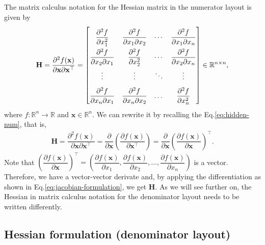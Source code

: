 \documentclass{article}
\begin{document}
The matrix calculus notation for the Hessian matrix in the numerator layout is given by
\begin{align}
    \label{eq:hessian-eq-numerator}
    \mathbf{H} = \dfrac{\partial^{2} f(\mathbf{x})}{\partial \mathbf{x} \partial \mathbf{x}^\top} = \renewcommand{\arraystretch}{2.2}\begin{bmatrix}
        \dfrac{\partial^{2} f}{\partial x_1^2} & \dfrac{\partial^{2} f}{\partial x_1 \partial x_2} & \cdots & \dfrac{\partial^{2} f}{\partial x_1 \partial x_n} \\
        \dfrac{\partial^{2} f}{\partial x_2 \partial x_1} & \dfrac{\partial^{2} f}{\partial x_2^2} & \cdots & \dfrac{\partial^{2} f}{\partial x_2 \partial x_n} \\
        \vdots & \vdots & \ddots & \vdots \\
        \dfrac{\partial^{2} f}{\partial x_n \partial x_1} & \dfrac{\partial^{2} f}{\partial x_n \partial x_2} & \dots & \dfrac{\partial^{2} f}{\partial x_n^2}
    \end{bmatrix} \in \mathbb{R}^{n \times n},
\end{align}
where \(f: \mathbb{R}^{n} \rightarrow \mathbb{R}\) and \(\mathbf{x} \in \mathbb{R}^{n}\). We can rewrite it by recalling the Eq.\eqref{eq:hidden-num}, that is,
\begin{align}
    \mathbf{H} = \dfrac{\partial^{2} f(\mathbf{x})}{\partial \mathbf{x} \partial \mathbf{x}^\top} = \dfrac{\partial }{\partial \mathbf{x}}\left( \dfrac{\partial f(\mathbf{x})}{\partial \mathbf{x}^\top} \right) = \dfrac{\partial }{\partial \mathbf{x}}\left( \dfrac{\partial f(\mathbf{x})}{\partial \mathbf{x}} \right)^\top.
\end{align}
Note that \(\left( \dfrac{\partial f(\mathbf{x})}{\partial \mathbf{x}} \right)^\top = \left( \dfrac{\partial f(\mathbf{x})}{\partial x_1}, \dfrac{\partial f(\mathbf{x})}{\partial x_2}, \dots, \dfrac{\partial f(\mathbf{x})}{\partial x_n} \right)\) is a vector. Therefore, we have a vector-vector derivate and, by applying the differentiation as shown in Eq.\eqref{eq:jacobian-formulation}, we get \(\mathbf{H}\). As we will see further on, the Hessian in matrix calculus notation for the denominator layout needs to be written differently.

\subsection{Hessian formulation (denominator layout)}
\label{sec:denominator}
\end{document}
